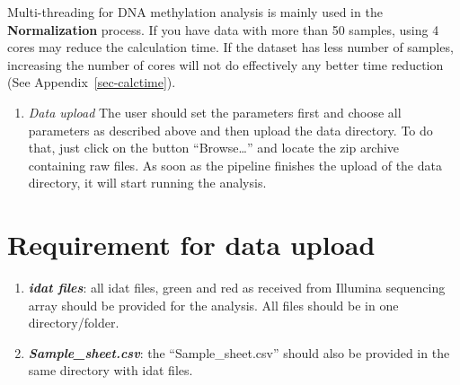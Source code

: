 \documentclass[
  a4paper,
  oneside,
  open=any]{scrreport}
\providecommand{\tightlist}{%
  \setlength{\itemsep}{0pt}\setlength{\parskip}{0pt}}\usepackage{longtable,booktabs,array}
\begin{document}
\begin{tcolorbox}[enhanced jigsaw, bottomrule=.15mm, left=2mm, coltitle=black, breakable, colback=white, arc=.35mm, rightrule=.15mm, opacitybacktitle=0.6, toptitle=1mm, leftrule=.75mm, toprule=.15mm, bottomtitle=1mm, opacityback=0, colbacktitle=quarto-callout-note-color!10!white, titlerule=0mm, colframe=quarto-callout-note-color-frame, title=\textcolor{quarto-callout-note-color}{\faInfo}\hspace{0.5em}{Note}]

Multi-threading for DNA methylation analysis is mainly used in the
\textbf{Normalization} process. If you have data with more than 50
samples, using 4 cores may reduce the calculation time. If the dataset
has less number of samples, increasing the number of cores will not do
effectively any better time reduction (See Appendix~\ref{sec-calctime}).

\end{tcolorbox}

\begin{enumerate}
\def\labelenumi{\arabic{enumi}.}
\setcounter{enumi}{1}
\tightlist
\item
  \emph{Data upload} The user should set the parameters first and choose
  all parameters as described above and then upload the data directory.
  To do that, just click on the button ``Browse\ldots{}'' and locate the
  zip archive containing raw files. As soon as the pipeline finishes the
  upload of the data directory, it will start running the analysis.
\end{enumerate}

\hypertarget{requirement-for-data-upload}{%
\section{Requirement for data
upload}\label{requirement-for-data-upload}}

\begin{enumerate}
\def\labelenumi{\arabic{enumi}.}
\tightlist
\item
  \textbf{\emph{idat files}}: all idat files, green and red as received
  from Illumina sequencing array should be provided for the analysis.
  All files should be in one directory/folder.
\item
  \textbf{\emph{Sample\_sheet.csv}}: the ``Sample\_sheet.csv'' should
  also be provided in the same directory with idat files.
\end{enumerate}
\end{document}
